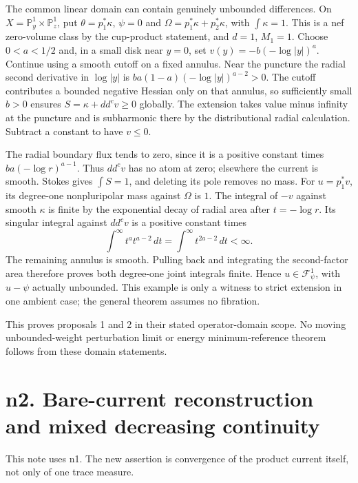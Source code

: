 \documentclass[
  11pt,
]{article}
\begin{document}
The common linear domain can contain genuinely unbounded differences. On
\(X=\mathbb{P}^1_y\times\mathbb{P}^1_z\), put \(\theta=p_1^*\kappa\),
\(\psi=0\) and \(\Omega=p_1^*\kappa+p_2^*\kappa\), with
\(\int\kappa=1\). This is a nef zero-volume class by the cup-product
statement, and \(d=1\), \(M_1=1\). Choose \(0<a<1/2\) and, in a small
disk near \(y=0\), set \(v(y)=-b(-\log|y|)^a\). Continue using a smooth
cutoff on a fixed annulus. Near the puncture the radial second
derivative in \(\log|y|\) is \(ba(1-a)(-\log|y|)^{a-2}>0\). The cutoff
contributes a bounded negative Hessian only on that annulus, so
sufficiently small \(b>0\) ensures \(S=\kappa+dd^cv\geq0\) globally. The
extension takes value minus infinity at the puncture and is subharmonic
there by the distributional radial calculation. Subtract a constant to
have \(v\leq0\).

The radial boundary flux tends to zero, since it is a positive constant
times \(ba(-\log r)^{a-1}\). Thus \(dd^cv\) has no atom at zero;
elsewhere the current is smooth. Stokes gives \(\int S=1\), and deleting
its pole removes no mass. For \(u=p_1^*v\), its degree-one nonpluripolar
mass against \(\Omega\) is \(1\). The integral of \(-v\) against smooth
\(\kappa\) is finite by the exponential decay of radial area after
\(t=-\log r\). Its singular integral against \(dd^cv\) is a positive
constant times \[
\int^\infty t^a t^{a-2}\,dt=\int^\infty t^{2a-2}\,dt<\infty.
\] The remaining annulus is smooth. Pulling back and integrating the
second-factor area therefore proves both degree-one joint integrals
finite. Hence \(u\in\mathcal{F}^1_\psi\), with \(u-\psi\) actually
unbounded. This example is only a witness to strict extension in one
ambient case; the general theorem assumes no fibration.

This proves proposals 1 and 2 in their stated operator-domain scope. No
moving unbounded-weight perturbation limit or energy minimum-reference
theorem follows from these domain statements.

\section{n2. Bare-current reconstruction and mixed decreasing
continuity}\label{n2.-bare-current-reconstruction-and-mixed-decreasing-continuity}

This note uses n1. The new assertion is convergence of the product
current itself, not only of one trace measure.
\end{document}
